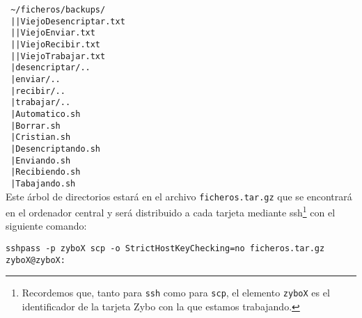 \documentclass[12pt,letterpaper]{article}
\begin{document}
\texttt{
\textasciitilde/ficheros/backups/\\
\textcolor{white}{.}\hspace{2.9cm}|\hspace{1.8cm}|ViejoDesencriptar.txt\\
\textcolor{white}{.}\hspace{2.9cm}|\hspace{1.8cm}|ViejoEnviar.txt\\
\textcolor{white}{.}\hspace{2.9cm}|\hspace{1.8cm}|ViejoRecibir.txt\\
\textcolor{white}{.}\hspace{2.9cm}|\hspace{1.8cm}|ViejoTrabajar.txt\\
\textcolor{white}{.}\hspace{2.9cm}|desencriptar/..\\
\textcolor{white}{.}\hspace{2.9cm}|enviar/..\\
\textcolor{white}{.}\hspace{2.9cm}|recibir/..\\
\textcolor{white}{.}\hspace{2.9cm}|trabajar/..\\
\textcolor{white}{.}\hspace{2.9cm}|Automatico.sh\\
\textcolor{white}{.}\hspace{2.9cm}|Borrar.sh\\
\textcolor{white}{.}\hspace{2.9cm}|Cristian.sh\\
\textcolor{white}{.}\hspace{2.9cm}|Desencriptando.sh\\
\textcolor{white}{.}\hspace{2.9cm}|Enviando.sh\\
\textcolor{white}{.}\hspace{2.9cm}|Recibiendo.sh\\
\textcolor{white}{.}\hspace{2.9cm}|Tabajando.sh
}\\

Este árbol de directorios estará en el archivo \texttt{ficheros.tar.gz} que se encontrará en el ordenador central y será distribuido a cada tarjeta mediante ssh\footnote{Recordemos que, tanto para \texttt{ssh} como para \texttt{scp}, el elemento \texttt{zyboX} es el identificador de la tarjeta Zybo con la que estamos trabajando.} con el siguiente comando:
\begin{center}
	\texttt{sshpass -p zyboX scp -o StrictHostKeyChecking=no ficheros.tar.gz zyboX@zyboX:}
\end{center}
\end{document}
